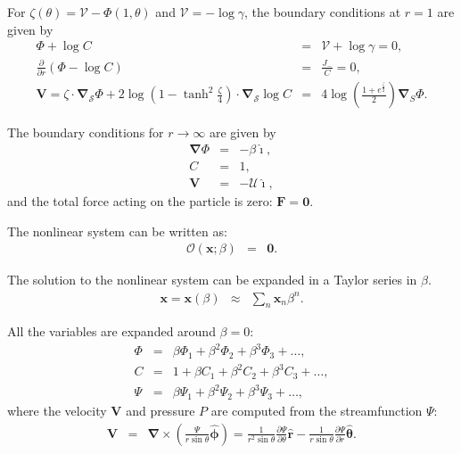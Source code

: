 \documentclass[final]{elsarticle}
\newcommand{\deriv}[2]{\frac{\partial #1}{\partial #2}}
\newcommand{\pars}[1]{\left(#1\right)}
\newcommand\bnabla{\boldsymbol{\nabla}}
\newcommand\bV{\boldsymbol{V}}
\newcommand\bF{\boldsymbol{F}}
\newcommand\bx{\boldsymbol{x}}
\newcommand\br{\boldsymbol{r}}
\newcommand\brhat{\hat{\br}}
\newcommand\btheta{\boldsymbol{\theta}}
\newcommand\bthetahat{\hat{\btheta}}
\newcommand\bphi{\boldsymbol{\phi}}
\newcommand\bphihat{\hat{\bphi}}
\newcommand\bzero{\boldsymbol{0}}
\newcommand\cO{\mathcal{O}}
\newcommand\cU{\mathscr{U}}
\newcommand\cV{\mathscr{V}}
\newcommand\ui{\boldsymbol{\hat{\imath}}}
\begin{document}
For $\zeta(\theta) = \cV - \varPhi(1, \theta)$ and 
$\cV = -\log \gamma$, the boundary conditions at $r = 1$ are given by
\begin{eqnarray*}
\varPhi + \log C &=& \cV + \log \gamma = 0, \\
\deriv{}{r}\pars{\varPhi - \log C} &=& \frac{J_-}{C} = 0, \\
\bV = \zeta \cdot \bnabla_\mathcal{S} \varPhi 
+ 2\log\pars{1-\tanh^2\frac{\zeta}{4}} \cdot \bnabla_\mathcal{S} \log C
&=& 4\log\pars{\frac{1 + e^\frac{\zeta}{2}}{2}} \bnabla_S \varPhi.
\end{eqnarray*}

The boundary conditions for $r \rightarrow \infty$ are given by
\begin{eqnarray*}
\bnabla \varPhi &=& -\beta \ui, \\
C &=& 1, \\
\bV &=& -\cU \ui,
\end{eqnarray*}
and the total force acting on the particle is zero: $\bF = \bzero$.

The nonlinear system can be written as: 
\begin{eqnarray*}
\cO(\bx;\beta) &=& \bzero.
\end{eqnarray*}

The solution to the nonlinear system can be expanded in a Taylor series in $\beta$.
\begin{eqnarray*}
\bx = \bx(\beta) &\approx& \sum_n \bx_n \beta^n.
\end{eqnarray*}

All the variables are expanded around $\beta = 0$:
\begin{eqnarray*}
\varPhi &=& \beta \varPhi_1 + \beta^2 \varPhi_2 + \beta^3 \varPhi_3 + \ldots, \\
C &=& 1 + \beta C_1 + \beta^2 C_2 + \beta^3 C_3 + \ldots, \\
\Psi &=& \beta \Psi_1 + \beta^2 \Psi_2 + \beta^3 \Psi_3 + \ldots ,
\end{eqnarray*}
where the velocity $\bV$ and pressure $P$ are computed from the streamfunction $\Psi$:
\begin{eqnarray*}
\bV &=& \bnabla \times \pars{\frac{\Psi}{r \sin\theta} \bphihat} 
= \frac{1}{r^2 \sin\theta} \deriv{\Psi}{\theta} \brhat 
- \frac{1}{r \sin\theta} \deriv{\Psi}{r} \bthetahat.
\end{eqnarray*}
\end{document}
